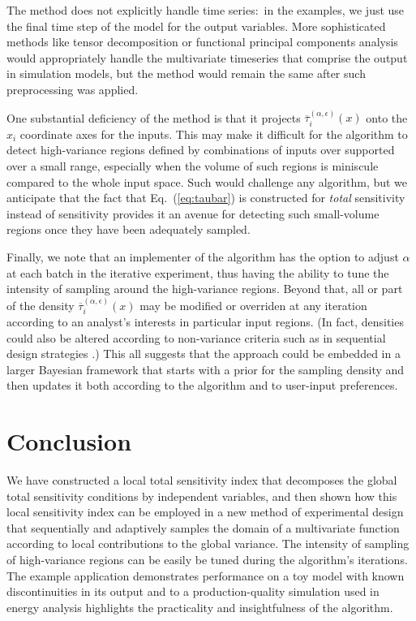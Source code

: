 \documentclass[12pt]{article}
\begin{document}
The method does not explicitly handle time series:\ in the examples, we just use the final time step of the model for the output variables. More sophisticated methods like tensor decomposition \cite{bugbee_enabling_2019} or functional principal components analysis \cite{ramsay_functional_2013} would appropriately handle the multivariate timeseries that comprise the output in simulation models, but the method would remain the same after such preprocessing was applied.

One substantial deficiency of the method is that it projects $\overline{\tau}_i^{(\alpha,\epsilon)}(x)$ onto the $x_i$ coordinate axes for the inputs. This may make it difficult for the algorithm to detect high-variance regions defined by combinations of inputs over supported over a small range, especially when the volume of such regions is miniscule compared to the whole input space. Such would challenge any algorithm, but we anticipate that the fact that Eq.~(\ref{eq:taubar}) is constructed for \textit{total} sensitivity instead of  sensitivity provides it an avenue for detecting such small-volume regions once they have been adequately sampled.

Finally, we note that an implementer of the algorithm has the option to adjust $\alpha$ at each batch in the iterative experiment, thus having the ability to tune the intensity of sampling around the high-variance regions. Beyond that, all or part of the density $\overline{\tau}_i^{(\alpha,\epsilon)}(x)$ may be modified or overriden at any iteration according to an analyst's interests in particular input regions. (In fact, densities could also be altered according to non-variance criteria such as in sequential design strategies \cite{box_statistics_2005}.) This all suggests that the approach could be embedded in a larger Bayesian framework that starts with a prior for the sampling density and then updates it both according to the algorithm and to user-input preferences.


\section{Conclusion}
\label{sec:conclude}

We have constructed a local total sensitivity index that decomposes the global total sensitivity conditions by independent variables, and then shown how this local sensitivity index can be employed in a new method of experimental design that sequentially and adaptively samples the domain of a multivariate function according to local contributions to the global variance. The intensity of sampling of high-variance regions can be easily be tuned during the algorithm's iterations. The example application demonstrates performance on a toy model with known discontinuities in its output and to a production-quality simulation used in energy analysis highlights the practicality and insightfulness of the algorithm.
\end{document}
